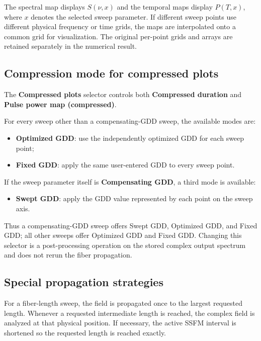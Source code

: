 \documentclass[11pt,a4paper]{article}
\begin{document}
The spectral map displays $S(\nu,x)$ and the temporal maps display $P(T,x)$,
where $x$ denotes the selected sweep parameter. If different sweep points use
different physical frequency or time grids, the maps are interpolated onto a
common grid for visualization. The original per-point grids and arrays are
retained separately in the numerical result.

\subsection{Compression mode for compressed plots}

The \textbf{Compressed plots} selector controls both \textbf{Compressed
duration} and \textbf{Pulse power map (compressed)}.

For every sweep other than a compensating-GDD sweep, the available modes are:

\begin{itemize}
    \item \textbf{Optimized GDD}: use the independently optimized GDD for each
    sweep point;
    \item \textbf{Fixed GDD}: apply the same user-entered GDD to every sweep
    point.
\end{itemize}

If the sweep parameter itself is \textbf{Compensating GDD}, a third mode is
available:

\begin{itemize}
    \item \textbf{Swept GDD}: apply the GDD value represented by each point on
    the sweep axis.
\end{itemize}

Thus a compensating-GDD sweep offers Swept GDD, Optimized GDD, and Fixed GDD;
all other sweeps offer Optimized GDD and Fixed GDD. Changing this selector is a
post-processing operation on the stored complex output spectrum and does not
rerun the fiber propagation.

\subsection{Special propagation strategies}

For a fiber-length sweep, the field is propagated once to the largest requested
length. Whenever a requested intermediate length is reached, the complex field
is analyzed at that physical position. If necessary, the active SSFM interval
is shortened so the requested length is reached exactly.
\end{document}
